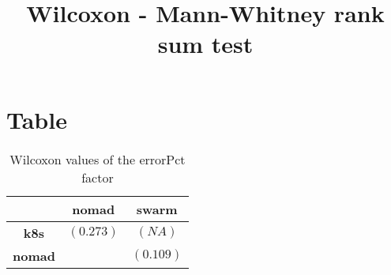 \documentclass{article}
\title{Wilcoxon - Mann-Whitney rank sum test}
\author{}
\begin{document}
\maketitle
\section{Table}
\begin{table}[!htp]
  \caption{Wilcoxon values of the errorPct factor}
  \label{table:errorPct}
  \centering
  \begin{scriptsize}
  \begin{tabular}{c|cc}
      & \textbf{nomad} & \textbf{swarm} \\\hline
      \textbf{k8s} & $(0.273) $ & $ (NA)$ \\
      \textbf{nomad} & $ $ & $ (0.109)$ \\
  \end{tabular}
  \end{scriptsize}
\end{table}
\end{document}

